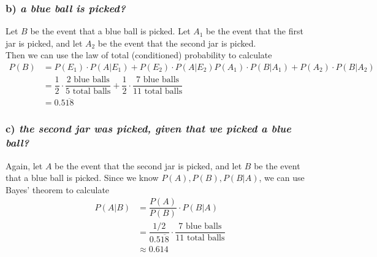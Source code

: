 \documentclass{article}
\begin{document}
\subsubsection*{b) {\em a blue ball is picked?}}
Let $B$ be the event that a blue ball is picked. Let $A_1$ be the event that the first jar is picked, and let $A_2$ be the event that the second jar is picked.\\
Then we can use the law of total (conditioned) probability to calculate
\begin{align*}
P(B)&=P(E_1)\cdot P(A|E_1)+P(E_2)\cdot P(A|E_2)P(A_1)\cdot P(B|A_1)+P(A_2)\cdot P(B|A_2)\\
&=\dfrac{1}{2}\cdot\dfrac{2\text{ blue balls}}{5\text{ total balls}}+\dfrac{1}{2}\cdot\dfrac{7\text{ blue balls}}{11\text{ total balls}}\\
&=0.5\overline{18}
\end{align*}

\subsubsection*{c) {\em the second jar was picked, given that we picked a blue ball?}}
Again, let $A$ be the event that the second jar is picked, and let $B$ be the event that a blue ball is picked. Since we know $P(A),P(B),P(B|A)$, we can use Bayes' theorem to calculate
\begin{align*}
P(A|B)&=\dfrac{P(A)}{P(B)}\cdot P(B|A)\\
&=\dfrac{1/2}{0.5\overline{18}}\cdot\dfrac{7\text{ blue balls}}{11\text{ total balls}}\\
&\approx 0.614
\end{align*}
\end{document}
